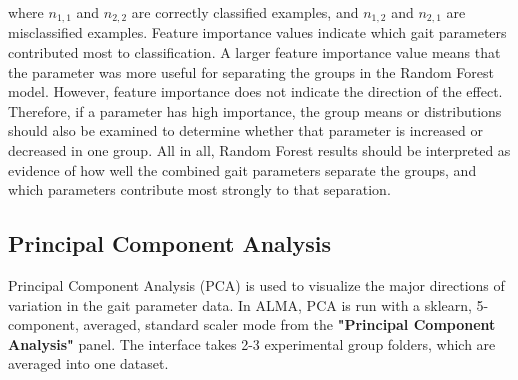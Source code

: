 \documentclass[11pt]{article}
\renewcommand{\[}{%
  \par\smallskip\noindent
  \begin{center}%
  \setlength{\fboxsep}{5pt}%
  \setlength{\fboxrule}{0.35pt}%
  \begin{lrbox}{\almaEquationBox}%
  $\displaystyle
}
\renewcommand{\]}{%
  $%
  \end{lrbox}%
  \fcolorbox{equationLine}{equationBack}{\usebox{\almaEquationBox}}%
  \end{center}%
  \smallskip\par
}
\begin{document}
\noindent where \(n_{1, 1}\) and \(n_{2,2}\) are correctly classified examples, and
\(n_{1,2}\) and \(n_{2,1}\) are misclassified examples. Feature importance values indicate which gait parameters contributed most to
classification. A larger feature importance value means that the parameter was
more useful for separating the groups in the Random Forest model. However,
feature importance does not indicate the direction of the effect. Therefore, if
a parameter has high importance, the group means or distributions should also be examined to determine whether that parameter is increased or decreased in one group. All in all, Random Forest results should be interpreted as evidence of how well the
combined gait parameters separate the groups, and which parameters contribute
most strongly to that separation.





\subsection{Principal Component Analysis}

Principal Component Analysis (PCA) is used to visualize the major directions of variation in the gait parameter data. In ALMA, PCA is run with a sklearn, 5-component, averaged, standard scaler mode from the \textbf{"Principal Component Analysis"} panel. The interface takes 2-3 experimental group folders, which are averaged into one dataset. 
\end{document}
